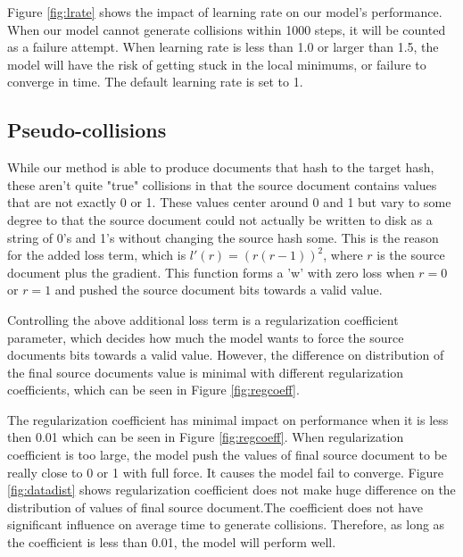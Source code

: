 \documentclass{article}
\begin{document}
Figure \ref{fig:lrate} shows the impact of learning rate on our model's performance. When our model cannot generate collisions within 1000 steps, it will be counted as a failure attempt. When learning rate is less than 1.0 or larger than 1.5, the model will have the risk of getting stuck in the local minimums, or failure to converge in time. The default learning rate is set to 1.

\subsection{Pseudo-collisions}
While our method is able to produce documents that hash to the target hash, these
aren't quite "true" collisions in that the source document contains values that
are not exactly 0 or 1. These values center around 0 and 1 but vary to some degree
to that the source document could not actually be written to disk as a string of 0's
and 1's without changing the source hash some. This is the reason for the added
loss term, which is $l'(r) = (r (r - 1))^2$, where $r$ is the source document
plus the gradient. This function  forms a 'w' with zero loss when $r = 0$ or
$r = 1$ and pushed the source document bits towards a valid value.

Controlling the above additional loss term is a regularization coefficient parameter, which decides how much the model wants to force the source documents bits towards a valid value. However, the difference on distribution of the final source documents value is minimal with different regularization coefficients, which can be seen in Figure \ref{fig:regcoeff}.

The regularization coefficient has minimal impact on performance when it is less then 0.01 which can be seen in Figure \ref{fig:regcoeff}. When regularization coefficient is too large, the model push the values of final source document to be really close to 0 or 1 with full force. It causes the model fail to converge. Figure \ref{fig:datadist} shows regularization coefficient does not make huge difference on the distribution of values of final source document.The coefficient does not have significant influence on average time to generate collisions. Therefore, as long as the coefficient is less than 0.01, the model will perform well.
\end{document}
